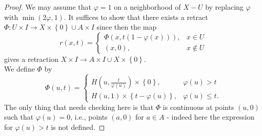 \documentclass[reqno]{amsart}
\theoremstyle{definition}
\theoremstyle{remark}
\begin{document}
\begin{proof}
    We may assume that $\varphi  = 1$ on a neighborhood
    of $X - U$ by replacing $\varphi $ with
    $\min \left( 2 \varphi , 1 \right) $.
    It suffices to show that there exists a retract
    $\Phi \colon U \times I \to X \times \left\{ 0 \right\} 
    \cup A \times I$ since then the
    map
    \[
    r\left( x,t \right) 
    =
    \begin{cases}
        \Phi\left( x, t \left( 1-\varphi (x) \right)  \right),&
        x \in U\\
        (x,0),& x \not\in U
    \end{cases}
    \] 
    gives a retraction $X \times I \to A \times I \cup 
    X \times \left\{ 0 \right\} $.\\
    We define $\Phi$ by
    \[
    \Phi(u,t) = 
    \begin{cases}
        H\left( u, \frac{t}{\varphi (u)} \right) \times 
        \left\{ 0 \right\},& \varphi (u) > t\\
        H\left( u,1 \right) \times 
        \left\{ t- \varphi (u) \right\} ,& \varphi (u)\le t.
    \end{cases}
    \] 
    The only thing that needs checking here is
    that $\Phi$ is continuous at
    points $\left( u,0 \right) $ such that
    $\varphi (u) = 0$, i.e., points $(a,0)$ for 
    $a \in A$ - indeed here the expression for
    $\varphi (u) > t$ is not defined.


\end{proof}
\end{document}
